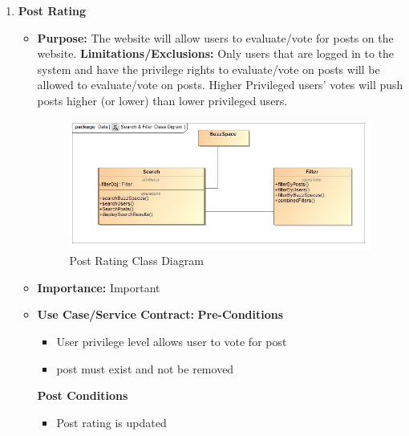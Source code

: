 \documentclass[11pt]{article}
\begin{document}
\begin{enumerate}
	
	
	 
\item \textbf{Post Rating}
\begin{itemize}
\item \textbf{Purpose: }The website will allow users to evaluate/vote for posts on the website. \newline \newline
	  \textbf{Limitations/Exclusions:} Only users that are logged in to the system and have the privilege rights to evaluate/vote on posts will be allowed to evaluate/vote on posts. Higher Privileged users' votes will push posts higher (or lower) than lower privileged users. \newline \newline
	  \graphicspath{ {../Diagrams/Sphe/PostRatings/} }
	  \begin{figure}[H]	
    	\includegraphics[scale=0.5]{ClassDiagram.jpg}
    	\caption{Post Rating Class Diagram}
	\end{figure}
	  \item \textbf{Importance: } Important \newline \newline
	  \item \textbf{Use Case/Service Contract: } \newline \newline
	  \textbf{Pre-Conditions}
	  \begin{itemize}
	  
	  \item User privilege level allows user to vote for post
	  \item post must exist and not be removed
	  \end{itemize}
	  \textbf{Post Conditions}
	  \begin{itemize}
	  \item Post rating is updated
	  

\end{itemize}
\end{itemize}
\end{enumerate}
\end{document}
